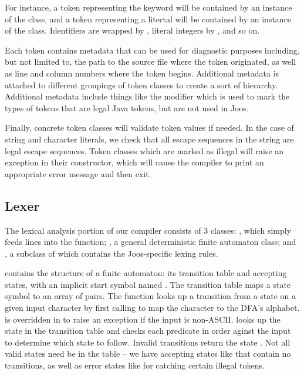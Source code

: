 \documentclass[pdftex,11pt,a4paper]{article}
\begin{document}
For instance, a token representing the keyword  will
be contained by an instance of the  class, and
a token representing a litertal  will be contained by an
instance of the  class. Identifiers are wrapped
by , literal integers by
, and so on.

Each token contains metadata that can be used for diagnostic purposes
including, but not limited to, the path to the source file where the
token originated, as well as line and column numbers where the token
begins. Additional metadata is attached to different groupings of token classes to create
a sort of hierarchy. Additional metadata include things like the
 modifier which is used to mark the types of tokens
that are legal Java tokens, but are not used in Joos.

Finally, concrete token classes will validate token values if
needed. In the case of string and character literals, we check that
all escape sequences in the string are legal escape sequences. Token
classes which are marked as illegal will raise an exception in their
constructor, which will cause the compiler to print an appropriate
error message and then exit.


\subsection{Lexer}

The lexical analysis portion of our compiler consists of 3 classes:
, which simply feeds lines into the 
function; , a general deterministic finite automaton class;
and , a subclass of  which contains the
Joos-specific lexing rules.

 contains the structure of a finite automaton: its
transition table and accepting states, with an implicit start symbol
named . The transition table maps a state symbol to an
array of  pairs. The  function
looks up a transition from a state on a given input character by
first calling  to map the character to the DFA's alphabet.
 is overridden in  to raise an exception
if the input is non-ASCII.  looks up the state in the
transition table and checks each predicate in order aginst the input
to determine which state to follow. Invalid transitions return the
state . Not all valid states need be in the table --
we have accepting states like  that contain
no transitions, as well as error states like  for
catching certain illegal tokens.
\end{document}
